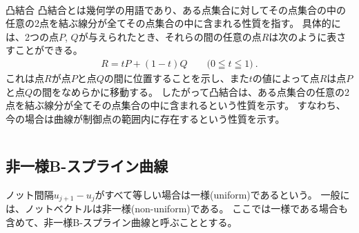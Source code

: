 ~\vfill
\begin{Column}{凸結合}
凸結合とは幾何学の用語であり、ある点集合に対してその点集合の中の任意の2点を結ぶ線分が全てその点集合の中に含まれる性質を指す。
具体的には、2つの点$P$, $Q$が与えられたとき、それらの間の任意の点$R$は次のように表さすことができる。
\begin{align*}
  R = tP+(1-t)Q\qquad\big(0 \leqq t \leqq 1\big)\ .
\end{align*}
これは点$R$が点$P$と点$Q$の間に位置することを示し、また$t$の値によって点$R$は点$P$と点$Q$の間をなめらかに移動する。
したがって凸結合は、ある点集合の任意の2点を結ぶ線分が全てその点集合の中に含まれるという性質を示す。
すなわち、今の場合は曲線が制御点の範囲内に存在するという性質を示す。
\end{Column}


\clearpage
\subsection{非一様B-スプライン曲線}
ノット間隔$u_{j+1}-u_j$がすべて等しい場合は一様(uniform)であるという。
一般には、ノットベクトルは非一様(non-uniform)である。
ここでは一様である場合も含めて、非一様B-スプライン曲線と呼ぶこととする。


